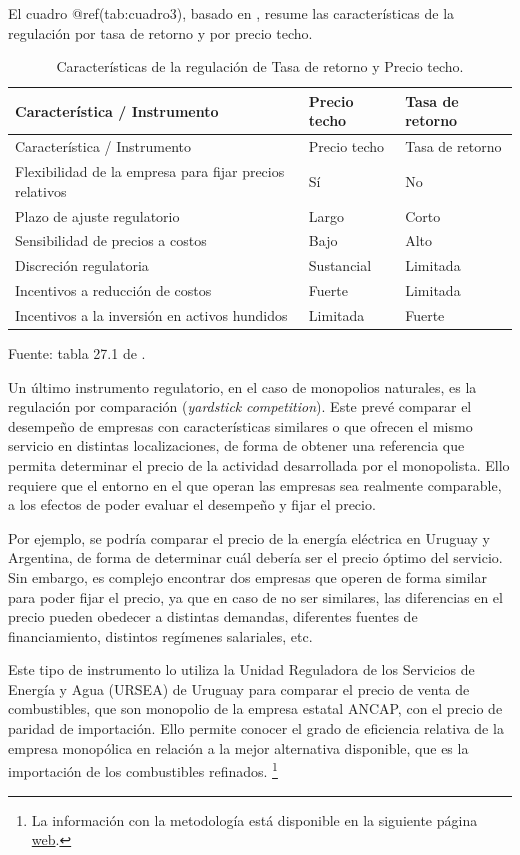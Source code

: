 \documentclass[
  12pt,
  spanish,
]{book}
\begin{document}
El cuadro @ref(tab:cuadro3), basado en \citet{Armstrong2007}, resume las
características de la regulación por tasa de retorno y por precio techo.

\begin{longtable}[]{@{}lll@{}}
\caption{Características de la regulación de Tasa de retorno y Precio
techo.}\tabularnewline
\toprule
Característica / Instrumento & Precio techo & Tasa de
retorno\tabularnewline
\midrule
\endfirsthead
\toprule
Característica / Instrumento & Precio techo & Tasa de
retorno\tabularnewline
\midrule
\endhead
Flexibilidad de la empresa para fijar precios relativos & Sí &
No\tabularnewline
Plazo de ajuste regulatorio & Largo & Corto\tabularnewline
Sensibilidad de precios a costos & Bajo & Alto\tabularnewline
Discreción regulatoria & Sustancial & Limitada\tabularnewline
Incentivos a reducción de costos & Fuerte & Limitada\tabularnewline
Incentivos a la inversión en activos hundidos & Limitada &
Fuerte\tabularnewline
\bottomrule
\end{longtable}

Fuente: tabla 27.1 de \citet{Armstrong2007}.

Un último instrumento regulatorio, en el caso de monopolios naturales,
es la regulación por comparación (\emph{yardstick} \emph{competition}).
Este prevé comparar el desempeño de empresas con características
similares o que ofrecen el mismo servicio en distintas localizaciones,
de forma de obtener una referencia que permita determinar el precio de
la actividad desarrollada por el monopolista. Ello requiere que el
entorno en el que operan las empresas sea realmente comparable, a los
efectos de poder evaluar el desempeño y fijar el precio.

Por ejemplo, se podría comparar el precio de la energía eléctrica en
Uruguay y Argentina, de forma de determinar cuál debería ser el precio
óptimo del servicio. Sin embargo, es complejo encontrar dos empresas que
operen de forma similar para poder fijar el precio, ya que en caso de no
ser similares, las diferencias en el precio pueden obedecer a distintas
demandas, diferentes fuentes de financiamiento, distintos regímenes
salariales, etc.

Este tipo de instrumento lo utiliza la Unidad Reguladora de los
Servicios de Energía y Agua (URSEA) de Uruguay para comparar el precio
de venta de combustibles, que son monopolio de la empresa estatal ANCAP,
con el precio de paridad de importación. Ello permite conocer el grado
de eficiencia relativa de la empresa monopólica en relación a la mejor
alternativa disponible, que es la importación de los combustibles
refinados. \footnote{La información con la metodología está disponible
  en la siguiente página
  \href{https://www.gub.uy/unidad-reguladora-servicios-energia-agua/sites/unidad-reguladora-servicios-energia-agua/files/2019-12/Metodologia_PPI_diciembre_2017_0\%281\%29.pdf}{web}.}
\end{document}
